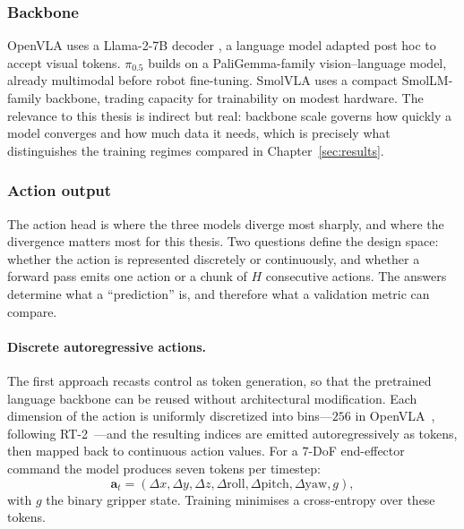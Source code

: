 \documentclass[english,12pt,a4paper,pdftex,elec,utf8]{aaltothesis}
\begin{document}
\subsubsection{Backbone}
\label{subsubsec:language}
OpenVLA uses a Llama-2-7B decoder \citep{touvron2023llama}, a language model adapted post hoc to accept visual tokens. $\pi_{0.5}$ builds on a PaliGemma-family vision--language model, already multimodal before robot fine-tuning. SmolVLA uses a compact SmolLM-family backbone, trading capacity for trainability on modest hardware. The relevance to this thesis is indirect but real: backbone scale governs how quickly a model converges and how much data it needs, which is precisely what distinguishes the training regimes compared in Chapter~\ref{sec:results}.

\subsubsection{Action output}
\label{subsubsec:action}

The action head is where the three models diverge most sharply, and where the divergence matters most for this thesis. Two questions define the design space: whether the action is represented discretely or continuously, and whether a forward pass emits one action or a chunk of $H$ consecutive actions. The
answers determine what a ``prediction'' is, and therefore what a validation metric can compare.

\paragraph{Discrete autoregressive actions.}
The first approach recasts control as token generation, so that the pretrained language backbone can be reused without architectural modification. Each dimension of the action is uniformly discretized into bins---$256$ in OpenVLA~\cite{kim2024openvla}, following RT-2~\cite{brohan2023rt2}---and the resulting indices are emitted autoregressively as tokens, then mapped back to continuous action values. For a $7$-DoF end-effector command the model produces seven tokens per timestep:
\begin{equation}
\mathbf{a}_t = (\Delta x, \Delta y, \Delta z,
\Delta\mathrm{roll}, \Delta\mathrm{pitch}, \Delta\mathrm{yaw}, g),
\end{equation}
with $g$ the binary gripper state. Training minimises a cross-entropy over these tokens.
\end{document}

